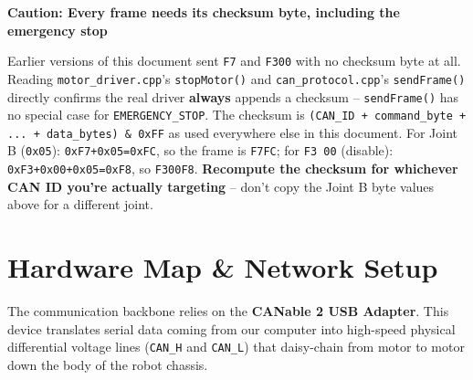 \documentclass[11pt,letterpaper]{article}
\newenvironment{caution}[1]{%
    \par\addvspace{8pt}%
    \noindent{\color{cautionred}\rule{\linewidth}{0.8pt}}\par\vspace{2pt}
    \noindent\textbf{\color{cautionred}Caution: #1}\par\vspace{2pt}
}{%
    \par\vspace{2pt}\noindent{\color{cautionred}\rule{\linewidth}{0.4pt}}%
    \par\addvspace{8pt}%
}
\begin{document}
\begin{caution}{Every frame needs its checksum byte, including the emergency stop}
Earlier versions of this document sent \texttt{F7} and \texttt{F300} with no checksum byte at all. Reading \texttt{motor\_driver.cpp}'s \texttt{stopMotor()} and \texttt{can\_protocol.cpp}'s \texttt{sendFrame()} directly confirms the real driver \textbf{always} appends a checksum -- \texttt{sendFrame()} has no special case for \texttt{EMERGENCY\_STOP}. The checksum is \texttt{(CAN\_ID + command\_byte + ... + data\_bytes) \& 0xFF} as used everywhere else in this document. For Joint B (\texttt{0x05}): \texttt{0xF7+0x05=0xFC}, so the frame is \texttt{F7FC}; for \texttt{F3 00} (disable): \texttt{0xF3+0x00+0x05=0xF8}, so \texttt{F300F8}. \textbf{Recompute the checksum for whichever CAN ID you're actually targeting} -- don't copy the Joint B byte values above for a different joint.
\end{caution}

\newpage
\section{Hardware Map \& Network Setup}
The communication backbone relies on the \textbf{CANable 2 USB Adapter}. This device translates serial data coming from our computer into high-speed physical differential voltage lines (\texttt{CAN\_H} and \texttt{CAN\_L}) that daisy-chain from motor to motor down the body of the robot chassis.
\end{document}
